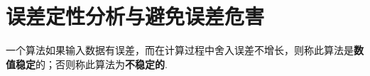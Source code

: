 \documentclass[../../main.tex]{subfiles}%
\begin{document}
\section{误差定性分析与避免误差危害}

\begin{definition}
一个算法如果输入数据有误差，而在计算过程中舍入误差不增长，则称此算法是\textbf{数值稳定}的；否则称此算法为\textbf{不稳定的}.
\end{definition}

\begin{example}

\end{example}
\begin{solution}


\end{solution}
\end{document}

